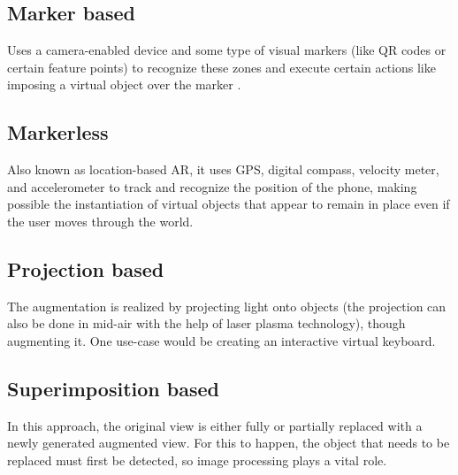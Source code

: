 \documentclass[12 pct]{report}
\begin{document}
\subsection*{Marker based}
Uses a camera-enabled device and some type of visual markers (like QR codes or certain feature points) to recognize these zones and execute certain actions like imposing a virtual object over the marker \cite{wagner2003first}  .
 
\subsection*{Markerless}
Also known as location-based AR, it uses GPS, digital compass, velocity meter, and accelerometer to track and recognize the position of the phone, making possible the instantiation of virtual objects that appear to remain in place even if the user moves through the world.

\subsection*{Projection based}
The augmentation is realized by projecting light onto objects (the projection can also be done in mid-air with the help of laser plasma technology), though augmenting it. One use-case would be creating an interactive virtual keyboard.


\subsection*{Superimposition based}
In this approach, the original view is either fully or partially replaced with a newly generated augmented view. For this to happen, the object that needs to be replaced must first be detected, so image processing plays a vital role.
\end{document}
